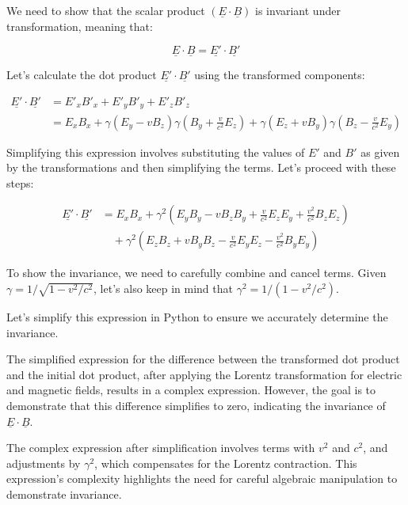 \documentclass[a4paper,11pt]{article}
\begin{document}
We need to show that the scalar product \( (\underline{E} \cdot \underline{B}) \) is invariant under transformation, meaning that:

\[
\underline{E} \cdot \underline{B} = \underline{E'} \cdot \underline{B'}
\]

Let's calculate the dot product \( \underline{E'} \cdot \underline{B'} \) using the transformed components:

\[
\begin{aligned}
\underline{E'} \cdot \underline{B'} &= E'_{x}B'_{x} + E'_{y}B'_{y} + E'_{z}B'_{z} \\
&= E_{x}B_{x} + \gamma(E_{y} - vB_{z})\gamma(B_{y} + \frac{v}{c^{2}}E_{z}) + \gamma(E_{z} + vB_{y})\gamma(B_{z} - \frac{v}{c^{2}}E_{y})
\end{aligned}
\]

Simplifying this expression involves substituting the values of \( E' \) and \( B' \) as given by the transformations and then simplifying the terms. Let's proceed with these steps:

\[
\begin{aligned}
\underline{E'} \cdot \underline{B'} &= E_{x}B_{x} + \gamma^2(E_{y}B_{y} - vB_{z}B_{y} + \frac{v}{c^{2}}E_{z}E_{y} + \frac{v^2}{c^{2}}B_{z}E_{z}) \\
&\quad + \gamma^2(E_{z}B_{z} + vB_{y}B_{z} - \frac{v}{c^{2}}E_{y}E_{z} - \frac{v^2}{c^{2}}B_{y}E_{y})
\end{aligned}
\]

To show the invariance, we need to carefully combine and cancel terms. Given \( \gamma = 1/\sqrt{1 - v^2/c^2} \), let's also keep in mind that \( \gamma^2 = 1/(1 - v^2/c^2) \).

Let's simplify this expression in Python to ensure we accurately determine the invariance.

The simplified expression for the difference between the transformed dot product and the initial dot product, after applying the Lorentz transformation for electric and magnetic fields, results in a complex expression. However, the goal is to demonstrate that this difference simplifies to zero, indicating the invariance of \(\underline{E} \cdot \underline{B}\).

The complex expression after simplification involves terms with \(v^2\) and \(c^2\), and adjustments by \(\gamma^2\), which compensates for the Lorentz contraction. This expression's complexity highlights the need for careful algebraic manipulation to demonstrate invariance.
\end{document}
